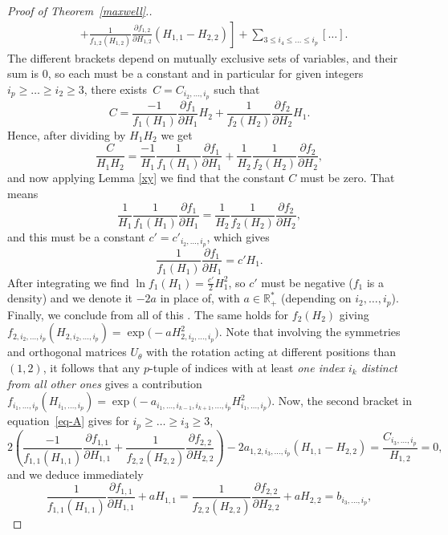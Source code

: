 \documentclass[pdftex]{sigma}
\numberwithin{equation}{section}
\theoremstyle{definition}
\begin{document}
\begin{proof}[Proof of Theorem~\ref{maxwell}.]
\begin{align}
    & \left.+ \frac{1}{f_{1,2}(H_{1,2})} \frac{\partial f_{1,2}}{\partial H_{1,2}} (H_{1,1} - H_{2,2}) \right]+ \sum_{3\leq i_4\leq \dots \leq i_p} \left[ \dots \right].\label{eq-A}
\end{align}
The different brackets depend on mutually exclusive sets of variables, and their sum is $0$, so each must be a constant and in particular for given integers $i_p\geq \dots \geq i_2 \geq 3$, there exists~${C=C_{i_2,\dots,i_p}}$ such that
\[C = \frac{-1}{f_1(H_1)} \frac{\partial f_{1}}{\partial H_{1}} H_2 + \frac{1}{f_2(H_2)} \frac{\partial f_{2}}{\partial H_{2}} H_1. \]
Hence, after dividing by $H_1H_2$ we get
\[ \frac{C}{H_1H_2} = \frac{-1}{H_1} \frac{1}{f_1(H_1)} \frac{\partial f_{1}}{\partial H_{1}} + \frac{1}{H_2}\frac{1}{f_2(H_2)} \frac{\partial f_{2}}{\partial H_{2}}, \]
and now applying Lemma \ref{xy} we find that the constant $C$ must be zero. That means
\[ \frac{1}{H_1} \frac{1}{f_1(H_1)} \frac{\partial f_{1}}{\partial H_{1}} = \frac{1}{H_2}\frac{1}{f_2(H_2)} \frac{\partial f_{2}}{\partial H_{2}}, \]
and this must be a constant $c'=c'_{i_2,\dots,i_p}$, which gives
\[\frac{1}{f_1(H_1)} \frac{\partial f_{1}}{\partial H_{1}} = c' H_1.\]
After integrating we find $\ln f_1(H_1) = \frac{c'}{2} H_1^2$, so $c'$ must be negative ($f_1$ is a density) and we denote it $-2a$ in place of, with $a \in \mathbb{R}^*_+$ (depending on ${i_2,\dots,i_p}$). Finally, we conclude from all of this
.
The same holds for $f_2(H_2)$ giving $f_{2,i_{2},\dots,i_p}(H_{2,i_{2},\dots,i_p}) = \exp\bigl(-a H_{2,i_{2},\dots,i_p}^2\bigr)$.
Note that involving the symmetries and orthogonal matrices $U_{\theta}$ with the rotation acting at different positions than~$(1,2)$, it follows that any $p$-tuple of indices with at least {\em one index $i_k$ distinct from all other ones} gives a contribution~${f_{i_{1},\dots,i_p}(H_{i_{1},\dots,i_p}) = \exp\bigl(-a_{i_1,\dots,i_{k-1},i_{k+1},\dots,i_p} H_{i_{1},\dots,i_p}^2\bigr)}$. Now, the second bracket in equation~\eqref{eq-A} gives for $i_p\geq\dots\geq i_3\geq 3$,
\[ 2 \left( \frac{-1}{f_{1,1}(H_{1,1})} \frac{\partial f_{1,1}}{\partial H_{1,1}} + \frac{1}{f_{2,2}(H_{2,2})} \frac{\partial f_{2,2}}{\partial H_{2,2}} \right) -2a_{1,2,i_3,\dots,i_p} (H_{1,1} - H_{2,2}) = \frac{C_{i_3,\dots,i_p}}{H_{1,2}} =0,\]
and we deduce immediately
\[ \frac{1}{f_{1,1}(H_{1,1})} \frac{\partial f_{1,1}}{\partial H_{1,1}} + a H_{1,1} = \frac{1}{f_{2,2}(H_{2,2})} \frac{\partial f_{2,2}}{\partial H_{2,2}} + a H_{2,2} = b_{i_3,\dots,i_p},\]

\end{proof}
\end{document}
